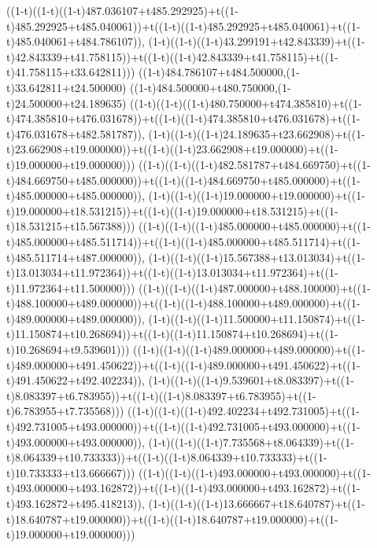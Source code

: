 ((1-t)((1-t)((1-t)487.036107+t485.292925)+t((1-t)485.292925+t485.040061))+t((1-t)((1-t)485.292925+t485.040061)+t((1-t)485.040061+t484.786107)),                                     (1-t)((1-t)((1-t)43.299191+t42.843339)+t((1-t)42.843339+t41.758115))+t((1-t)((1-t)42.843339+t41.758115)+t((1-t)41.758115+t33.642811)))
((1-t)484.786107+t484.500000,(1-t)33.642811+t24.500000)
((1-t)484.500000+t480.750000,(1-t)24.500000+t24.189635)
((1-t)((1-t)((1-t)480.750000+t474.385810)+t((1-t)474.385810+t476.031678))+t((1-t)((1-t)474.385810+t476.031678)+t((1-t)476.031678+t482.581787)),                                     (1-t)((1-t)((1-t)24.189635+t23.662908)+t((1-t)23.662908+t19.000000))+t((1-t)((1-t)23.662908+t19.000000)+t((1-t)19.000000+t19.000000)))
((1-t)((1-t)((1-t)482.581787+t484.669750)+t((1-t)484.669750+t485.000000))+t((1-t)((1-t)484.669750+t485.000000)+t((1-t)485.000000+t485.000000)),                                     (1-t)((1-t)((1-t)19.000000+t19.000000)+t((1-t)19.000000+t18.531215))+t((1-t)((1-t)19.000000+t18.531215)+t((1-t)18.531215+t15.567388)))
((1-t)((1-t)((1-t)485.000000+t485.000000)+t((1-t)485.000000+t485.511714))+t((1-t)((1-t)485.000000+t485.511714)+t((1-t)485.511714+t487.000000)),                                     (1-t)((1-t)((1-t)15.567388+t13.013034)+t((1-t)13.013034+t11.972364))+t((1-t)((1-t)13.013034+t11.972364)+t((1-t)11.972364+t11.500000)))
((1-t)((1-t)((1-t)487.000000+t488.100000)+t((1-t)488.100000+t489.000000))+t((1-t)((1-t)488.100000+t489.000000)+t((1-t)489.000000+t489.000000)),                                     (1-t)((1-t)((1-t)11.500000+t11.150874)+t((1-t)11.150874+t10.268694))+t((1-t)((1-t)11.150874+t10.268694)+t((1-t)10.268694+t9.539601)))
((1-t)((1-t)((1-t)489.000000+t489.000000)+t((1-t)489.000000+t491.450622))+t((1-t)((1-t)489.000000+t491.450622)+t((1-t)491.450622+t492.402234)),                                     (1-t)((1-t)((1-t)9.539601+t8.083397)+t((1-t)8.083397+t6.783955))+t((1-t)((1-t)8.083397+t6.783955)+t((1-t)6.783955+t7.735568)))
((1-t)((1-t)((1-t)492.402234+t492.731005)+t((1-t)492.731005+t493.000000))+t((1-t)((1-t)492.731005+t493.000000)+t((1-t)493.000000+t493.000000)),                                     (1-t)((1-t)((1-t)7.735568+t8.064339)+t((1-t)8.064339+t10.733333))+t((1-t)((1-t)8.064339+t10.733333)+t((1-t)10.733333+t13.666667)))
((1-t)((1-t)((1-t)493.000000+t493.000000)+t((1-t)493.000000+t493.162872))+t((1-t)((1-t)493.000000+t493.162872)+t((1-t)493.162872+t495.418213)),                                     (1-t)((1-t)((1-t)13.666667+t18.640787)+t((1-t)18.640787+t19.000000))+t((1-t)((1-t)18.640787+t19.000000)+t((1-t)19.000000+t19.000000)))
